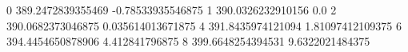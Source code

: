 0 389.2472839355469 -0.78533935546875
1 390.0326232910156 0.0
2 390.0682373046875 0.035614013671875
4 391.8435974121094 1.81097412109375
6 394.4454650878906 4.412841796875
8 399.6648254394531 9.6322021484375
